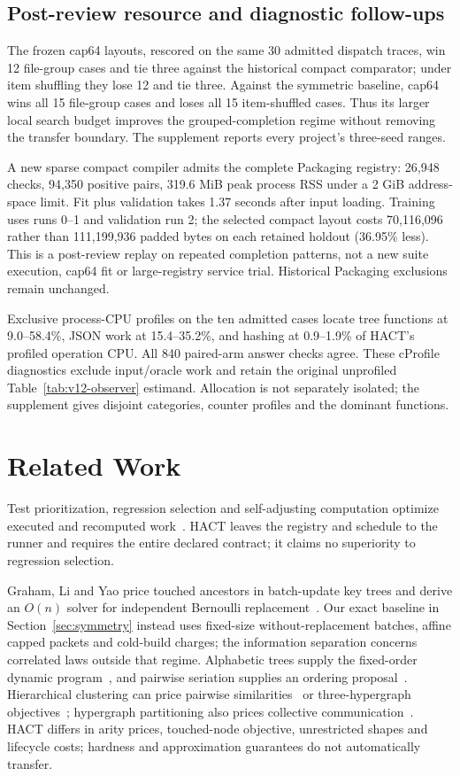 \documentclass[10pt,journal,compsoc]{IEEEtran}
\theoremstyle{definition}\newtheorem{definition}[theorem]{Definition}
\begin{document}
\subsection{Post-review resource and diagnostic follow-ups}
The frozen cap64 layouts, rescored on the same 30 admitted dispatch traces,
win 12 file-group cases and tie three against the historical compact
comparator; under item shuffling they lose 12 and tie three.
Against the symmetric baseline, cap64 wins all 15 file-group cases and
loses all 15 item-shuffled cases. Thus its larger local search budget
improves the grouped-completion regime without removing the transfer
boundary. The supplement reports every project's three-seed ranges.

A new sparse compact compiler admits the complete Packaging registry: 26,948 checks, 94,350 positive pairs, 319.6 MiB peak process RSS under a 2 GiB address-space limit. Fit plus validation takes 1.37 seconds after input loading. Training uses runs 0--1 and validation run 2; the selected compact layout costs 70,116,096 rather than 111,199,936 padded bytes on each retained holdout (36.95\% less). This is a post-review replay on repeated completion patterns, not a new suite execution, cap64 fit or large-registry service trial. Historical Packaging exclusions remain unchanged.

Exclusive process-CPU profiles on the ten admitted cases locate tree
functions at 9.0--58.4\%, JSON work at 15.4--35.2\%, and hashing at
0.9--1.9\% of HACT's profiled operation CPU. All 840 paired-arm answer
checks agree. These cProfile diagnostics exclude input/oracle work and
retain the original unprofiled Table~\ref{tab:v12-observer} estimand.
Allocation is not separately isolated; the supplement gives disjoint
categories, counter profiles and the dominant functions.

\section{Related Work}\label{sec:jrelated}
Test prioritization, regression selection and self-adjusting computation
optimize executed and recomputed work~\cite{rothermel,ekstazi,acar,build}.
HACT leaves the registry and schedule to the runner and requires the entire
declared contract; it claims no superiority to regression selection.

Graham, Li and Yao price touched ancestors in batch-update key trees and
derive an $O(n)$ solver for independent Bernoulli replacement~\cite{graham2007}.
Our exact baseline in Section~\ref{sec:symmetry} instead uses fixed-size
without-replacement batches, affine capped packets and cold-build charges;
the information separation concerns correlated laws outside that regime.
Alphabetic trees supply the fixed-order dynamic program~\cite{alphabetic},
and pairwise seriation supplies an ordering proposal~\cite{atkins}.
Hierarchical clustering can price pairwise similarities~\cite{dasgupta} or
three-hypergraph objectives~\cite{hyperhierarchy}; hypergraph partitioning
also prices collective communication~\cite{hyperpartition}. HACT differs in
arity prices, touched-node objective, unrestricted shapes and lifecycle costs;
hardness and approximation guarantees do not automatically transfer.
\end{document}
